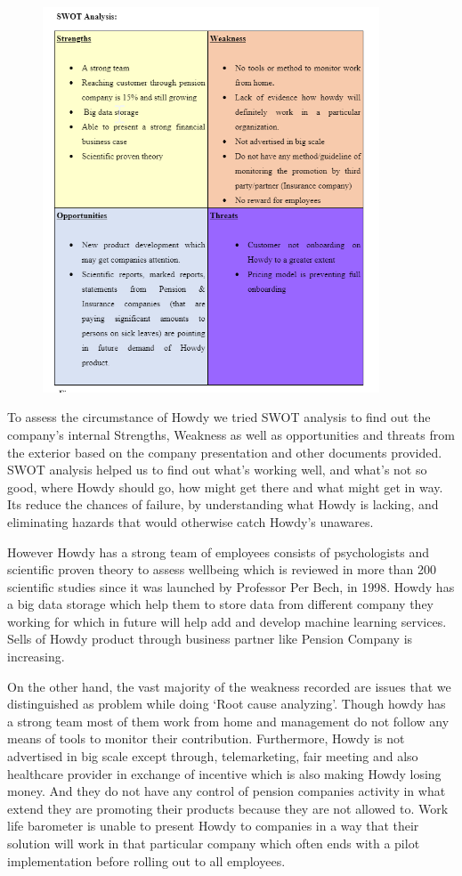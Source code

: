 \begin{figure}[H]
\includegraphics[width=10cm]{figures/SWATDRAFT.png}
\centering
\end{figure}
To assess the circumstance of Howdy we tried SWOT analysis to find out the company’s internal Strengths, Weakness as well as opportunities and threats from the exterior based on the company presentation and other documents provided. SWOT analysis helped us to find out what's working well, and what's not so good, where Howdy should go, how might get there and what might get in way. Its reduce the chances of failure, by understanding what Howdy is lacking, and eliminating hazards that would otherwise catch Howdy’s unawares.

\noindent However Howdy has a strong team of employees consists of psychologists and scientific proven theory to assess wellbeing which is reviewed in more than 200 scientific studies since it was launched by Professor Per Bech, in 1998. Howdy has a big data storage which help them to store data from different company they working for which in future will help add and develop machine learning services. Sells of Howdy product through business partner like Pension Company is increasing.

\noindent On the other hand, the vast majority of the weakness recorded are issues that we distinguished as problem while doing ‘Root cause analyzing’. Though howdy has a strong team most of them work from home and management do not follow any means of tools to monitor their contribution. Furthermore, Howdy is not advertised in big scale except through, telemarketing, fair meeting and also healthcare provider in exchange of incentive which is also making Howdy losing money. And they do not have any control of pension companies activity in what extend they are promoting their products because they are not allowed to. Work life barometer is unable to present Howdy to companies in a way that their solution will work in that particular company which often ends with a pilot implementation before rolling out to all employees.

